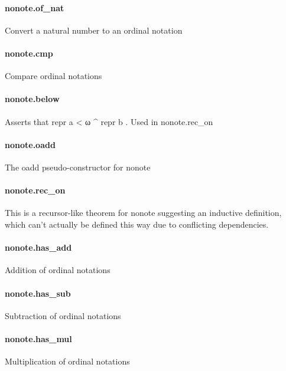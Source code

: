 \documentclass{article}
\begin{document}
\paragraph{nonote.of\_nat}
\par
Convert a natural number to an ordinal notation
\paragraph{nonote.cmp}
\par
Compare ordinal notations
\paragraph{nonote.below}
\par
Asserts that 
\colorbox[RGB]{253,246,227}{{{{\color[RGB]{101, 123, 131} repr a  }}}{{{\color[RGB]{181, 137, 0} < }}}{{{\color[RGB]{101, 123, 131}  ω \textasciicircum{} repr b }}}}. Used in 
\colorbox[RGB]{253,246,227}{{{{\color[RGB]{101, 123, 131} nonote.rec\_on }}}}\paragraph{nonote.oadd}
\par
The 
\colorbox[RGB]{253,246,227}{{{{\color[RGB]{101, 123, 131} oadd }}}} pseudo-constructor for 
\colorbox[RGB]{253,246,227}{{{{\color[RGB]{101, 123, 131} nonote }}}}\paragraph{nonote.rec\_on}
\par
This is a recursor-like theorem for 
\colorbox[RGB]{253,246,227}{{{{\color[RGB]{101, 123, 131} nonote }}}} suggesting an
inductive definition, which can't actually be defined this
way due to conflicting dependencies.
\paragraph{nonote.has\_add}
\par
Addition of ordinal notations
\paragraph{nonote.has\_sub}
\par
Subtraction of ordinal notations
\paragraph{nonote.has\_mul}
\par
Multiplication of ordinal notations
\end{document}
